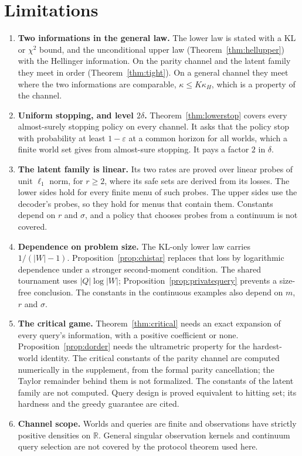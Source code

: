 \section{Limitations}
\label{sec:limits}

\begin{enumerate}
\item[1)] \textbf{Two informations in the general law.} The lower law is stated with a KL or
$\chi^{2}$ bound, and the unconditional upper law (Theorem~\ref{thm:hellupper}) with the
Hellinger information. On the parity channel and the latent family they meet in order
(Theorem~\ref{thm:tight}). On a general channel they meet where the two informations are
comparable, $\kappa\le K\kappa_{H}$, which is a property of the channel.
\item[2)] \textbf{Uniform stopping, and level $2\delta$.} Theorem~\ref{thm:lowerstop} covers
every almost-surely stopping policy on every channel. It asks that the policy stop with
probability at least $1-\varepsilon$ at a common horizon for all worlds, which a finite world set
gives from almost-sure stopping. It pays a factor $2$ in $\delta$.
\item[3)] \textbf{The latent family is linear.} Its two rates are proved over linear probes of
unit $\ell_{1}$ norm, for $r\ge2$, where its safe sets are derived from its losses. The lower
sides hold for every finite menu of such probes. The upper sides use the decoder's probes, so
they hold for menus that contain them. Constants depend on $r$ and $\sigma$, and a policy that
chooses probes from a continuum is not covered.
\item[4)] \textbf{Dependence on problem size.} The KL-only lower law carries
$1/(|W|-1)$. Proposition~\ref{prop:chistar} replaces that loss by logarithmic dependence
under a stronger second-moment condition. The shared tournament uses $|Q|\log|W|$;
Proposition~\ref{prop:privatequery} prevents a size-free conclusion. The constants in the
continuous examples also depend on $m$, $r$ and $\sigma$.
\item[5)] \textbf{The critical game.} Theorem~\ref{thm:critical} needs an exact expansion of every
query's information, with a positive coefficient or none. Proposition~\ref{prop:dorder} needs
the ultrametric property for the hardest-world identity. The critical constants of the parity
channel are computed numerically in the supplement, from the formal parity cancellation; the
Taylor remainder behind them is not formalized. The constants of the latent family are not
computed. Query design is proved equivalent to hitting set; its hardness and the greedy
guarantee are cited.
\item[6)] \textbf{Channel scope.} Worlds and queries are finite and observations have strictly
positive densities on $\mathbb R$. General singular observation kernels and continuum query
selection are not covered by the protocol theorem used here.
\end{enumerate}

